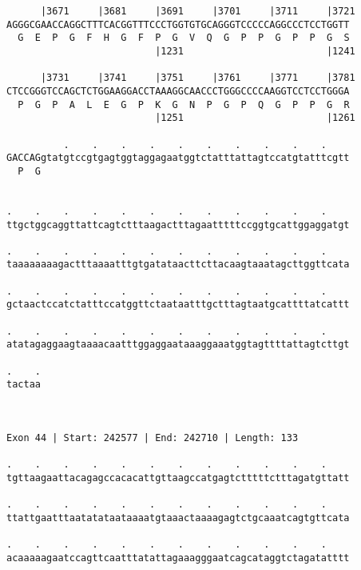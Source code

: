 \documentclass{article}
\begin{document}
\begin{Verbatim}
      |3671     |3681     |3691     |3701     |3711     |3721
AGGGCGAACCAGGCTTTCACGGTTTCCCTGGTGTGCAGGGTCCCCCAGGCCCTCCTGGTT
  G  E  P  G  F  H  G  F  P  G  V  Q  G  P  P  G  P  P  G  S
                          |1231                         |1241
  
      |3731     |3741     |3751     |3761     |3771     |3781
CTCCGGGTCCAGCTCTGGAAGGACCTAAAGGCAACCCTGGGCCCCAAGGTCCTCCTGGGA
  P  G  P  A  L  E  G  P  K  G  N  P  G  P  Q  G  P  P  G  R
                          |1251                         |1261
  
          .    .    .    .    .    .    .    .    .    .    
GACCAGgtatgtccgtgagtggtaggagaatggtctatttattagtccatgtatttcgtt
  P  G                                                      
                                                            
  
.    .    .    .    .    .    .    .    .    .    .    .    
ttgctggcaggttattcagtctttaagactttagaatttttccggtgcattggaggatgt
                                                            
.    .    .    .    .    .    .    .    .    .    .    .    
taaaaaaaagactttaaaatttgtgatataacttcttacaagtaaatagcttggttcata
                                                            
.    .    .    .    .    .    .    .    .    .    .    .    
gctaactccatctatttccatggttctaataatttgctttagtaatgcattttatcattt
                                                            
.    .    .    .    .    .    .    .    .    .    .    .    
atatagaggaagtaaaacaatttggaggaataaaggaaatggtagttttattagtcttgt
                                                            
.    .
tactaa
      
      
 
Exon 44 | Start: 242577 | End: 242710 | Length: 133
 
.    .    .    .    .    .    .    .    .    .    .    .    
tgttaagaattacagagccacacattgttaagccatgagtctttttctttagatgttatt
                                                            
.    .    .    .    .    .    .    .    .    .    .    .    
ttattgaatttaatatataataaaatgtaaactaaaagagtctgcaaatcagtgttcata
                                                            
.    .    .    .    .    .    .    .    .    .    .    .    
acaaaaagaatccagttcaatttatattagaaagggaatcagcataggtctagatatttt
                                                            

\end{Verbatim}
\end{document}
